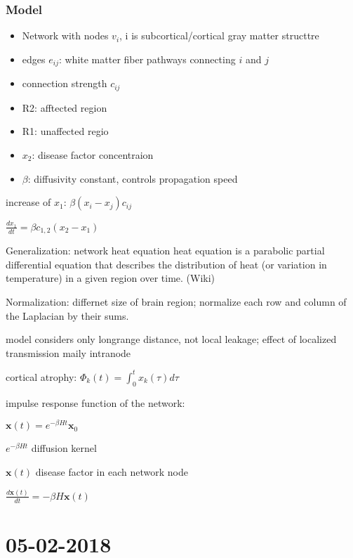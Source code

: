 \documentclass[fleqn]{article}\usepackage{caption}
\begin{document}
\subsubsection{Model}
\begin{itemize}
\item Network with nodes $v_i$, i is subcortical/cortical gray matter structtre
\item edges $e_{ij}$: white matter fiber pathways connecting $i$ and $j$
\item connection strength $c_{ij}$
\item R2: afftected region 
\item R1: unaffected regio
\item $x_2$: disease factor concentraion
\item $\beta$: diffusivity constant, controls propagation speed
\end{itemize}

increase of $x_1$: $\beta (x_i-x_j) c_{ij}$

$\frac{dx_1}{dt} = \beta c_{1,2} (x_2-x_1)$

Generalization: network heat equation
heat equation is a parabolic partial differential equation that describes the distribution of heat (or variation in temperature) in a given region over time. (Wiki)

Normalization: differnet size of brain region; normalize each row and column of the Laplacian by their sums.

model considers only longrange distance, not local leakage; effect of localized transmission maily intranode

cortical atrophy:
$\Phi_k(t) = \int_0^t x_k(\tau) d\tau $

impulse response function of the network:

$\textbf{x}(t) = e^{-\beta H t} \textbf{x}_0$
 
$e^{-\beta H t} $ diffusion kernel

$\textbf{x}(t)$ disease factor in each network node

$\frac{d\textbf{x}(t)}{dt} = -\beta H \textbf{x}(t)$



\section{05-02-2018}
\end{document}
